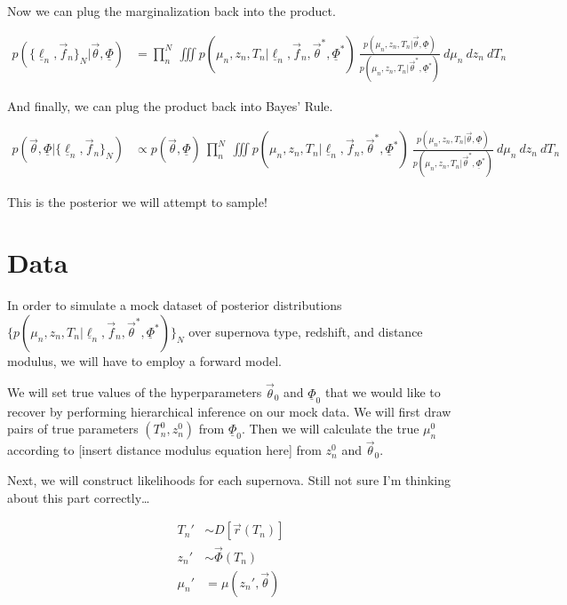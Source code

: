 \documentclass[12pt, onecolumn]{emulateapj}
\newcommand{\textul}{\underline}
\begin{document}
Now we can plug the marginalization back into the product.

\begin{align}
p(\{\textul{\ell}_{n}, \vec{f}_{n}\}_{N} | \vec{\theta}, \textul{\Phi}) &= \prod_{n}^{N}\ \iiint p(\mu_{n}, z_{n}, T_{n} | \textul{\ell}_{n}, \vec{f}_{n}, \vec{\theta}^{*}, \textul{\Phi}^{*})\ \frac{p(\mu_{n}, z_{n}, T_{n} | \vec{\theta}, \textul{\Phi})}{p(\mu_{n}, z_{n}, T_{n} | \vec{\theta}^{*}, \textul{\Phi}^{*})}\ d\mu_{n}\ dz_{n}\ dT_{n}
\end{align}

And finally, we can plug the product back into Bayes' Rule.

\begin{align}
p(\vec{\theta}, \textul{\Phi} | \{\textul{\ell}_{n}, \vec{f}_{n}\}_{N}) &\propto p(\vec{\theta}, \textul{\Phi})\ \prod_{n}^{N}\ \iiint p(\mu_{n}, z_{n}, T_{n} | \textul{\ell}_{n}, \vec{f}_{n}, \vec{\theta}^{*}, \textul{\Phi}^{*})\ \frac{p(\mu_{n}, z_{n}, T_{n} | \vec{\theta}, \textul{\Phi})}{p(\mu_{n}, z_{n}, T_{n} | \vec{\theta}^{*}, \textul{\Phi}^{*})}\ d\mu_{n}\ dz_{n}\ dT_{n}
\end{align}

This is the posterior we will attempt to sample!

\section{Data}
\label{sec:data}

In order to simulate a mock dataset of posterior distributions $\{p(\mu_{n}, z_{n}, T_{n} | \textul{\ell}_{n}, \vec{f}_{n}, \vec{\theta}^{*}, \textul{\Phi}^{*})\}_{N}$ over supernova type, redshift, and distance modulus, we will have to employ a forward model.

We will set true values of the hyperparameters $\vec{\theta}_{0}$ and $\textul{\Phi}_{0}$ that we would like to recover by performing hierarchical inference on our mock data.  We will first draw pairs of true parameters $(T_{n}^{0}, z_{n}^{0})$ from $\textul{\Phi}_{0}$.  Then we will calculate the true $\mu_{n}^{0}$ according to [insert distance modulus equation here] from $z_{n}^{0}$ and $\vec{\theta}_{0}$.

Next, we will construct likelihoods for each supernova.  Still not sure I'm thinking about this part correctly\dots

\begin{align}
T_{n}' &\sim D[\vec{r}(T_{n})]\\
z_{n}' &\sim \vec{\Phi}(T_{n})\\
\mu_{n}' &= \mu(z_{n}', \vec{\theta})
\end{align}




\end{document}
